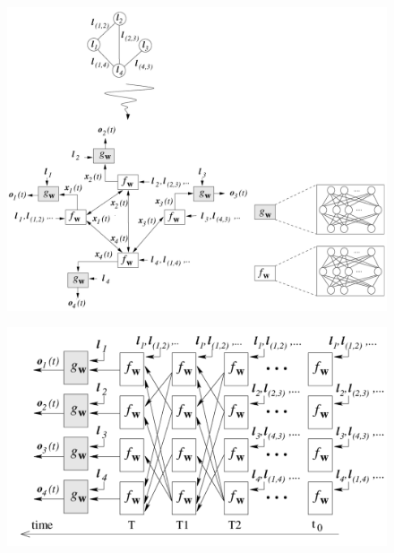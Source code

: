 \documentclass[10pt,aspectratio=169]{beamer}
\begin{document}
\begin{frame}[allowframebreaks]
    \begin{figure}
        \centering
        \includegraphics[width=.65\textwidth]{pic/network1.png}
    \end{figure}

    \begin{figure}
        \centering
        \includegraphics[width=.65\textwidth]{pic/network2.png}
    \end{figure}

\end{frame}
\end{document}
